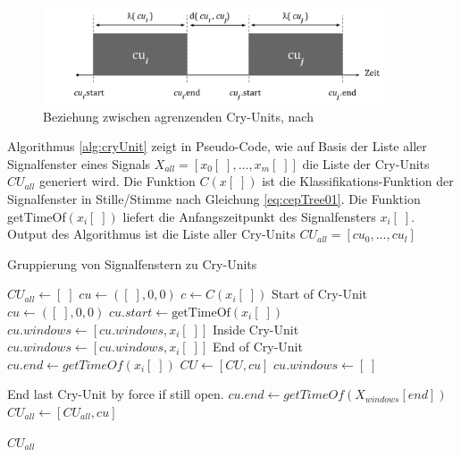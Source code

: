 \begin{figure}[h]
	\centering
	\includegraphics[width=0.9\textwidth]{bilder/newSmoothing05.png}
	\caption{Beziehung zwischen agrenzenden Cry-Units, nach \cite[S. 2]{vad_entropy}}
	\label{img:cryUnit-details}
\end{figure}

Algorithmus \ref{alg:cryUnit} zeigt in Pseudo-Code, wie auf Basis der Liste aller Signalfenster eines Signals $X_{all} = [x_0[\;] ,\ldots, x_m[\;]]$ die Liste der Cry-Units $CU_{all}$ generiert wird. Die Funktion $C(x[\;])$ ist die Klassifikations-Funktion der Signalfenster in Stille/Stimme nach Gleichung \ref{eq:cepTree01}. Die Funktion getTimeOf$(x_i[\;])$ liefert die Anfangszeitpunkt des Signalfensters $x_i[\;]$. Output des Algorithmus ist die Liste aller Cry-Units $CU_{all} = [cu_0 , \ldots, cu_l]$

\begin{algorithm}[h]
	\caption{Gruppierung von Signalfenstern zu Cry-Units}
	\label{alg:cryUnit}
	\begin{algorithmic}[1]
		\State $ CU_{all} \gets [\;]$
		\State $ cu\gets ([\;],0,0)$
				\State $ c \gets C(x_i[\;])$
				\State \Comment Start of Cry-Unit
						\State $cu\gets ([\;],0,0)$
						\State $cu.start \gets \text{getTimeOf}(x_i[\;])$
						\State $cu.windows \gets [cu.windows, x_i[\;]]$
				\EndIf
				\State \Comment Inside Cry-Unit
						\State $cu.windows \gets [cu.windows, x_i[\;]]$
				\EndIf
				\State \Comment End of Cry-Unit
						\State $cu.end \gets  getTimeOf(x_i[\;])$
						\State $CU \gets [CU, cu]$
						\State $cu.windows \gets [\;]$
				\EndIf
		\EndFor
		
		\State \Comment End last Cry-Unit by force if still open.
		\State $cu.end \gets  getTimeOf(X_{windows}[end])$
		\State $CU_{all} \gets [CU_{all}, cu]$
		\EndIf
		
		\Return $CU_{all}$
		
		\EndFunction
		
	\end{algorithmic}
\end{algorithm}

